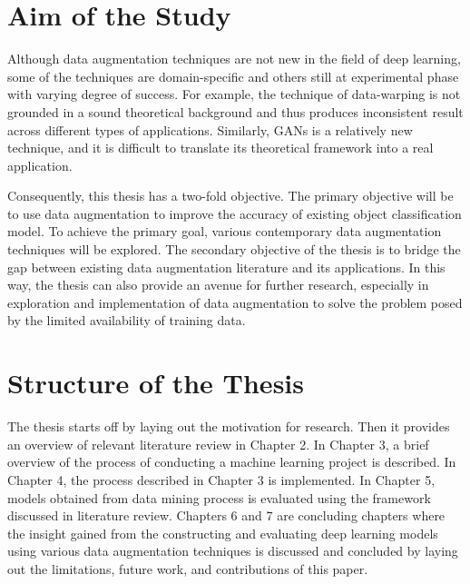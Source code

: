 \section{Aim of the Study}

Although data augmentation techniques are not new in the field of deep learning, some of the techniques are domain-specific and others still at experimental phase with varying degree of success. For example, the technique of data-warping is not grounded in a sound theoretical background and thus produces inconsistent result across different types of applications. Similarly, GANs is a relatively new technique, and it is difficult to translate its theoretical framework into a real application.

Consequently, this thesis has a two-fold objective. The primary objective will be to use data augmentation to improve the accuracy of existing object classification model. To achieve the primary goal, various contemporary data augmentation techniques will be explored. The secondary objective of the thesis is to bridge the gap between existing data augmentation literature and its applications. In this way, the thesis can also provide an avenue for further research, especially in exploration and implementation of data augmentation to solve the problem posed by the limited availability of training data. 

\section{Structure of the Thesis}
\label{section:structure} 
The thesis starts off by laying out the motivation for research. Then it provides an overview of relevant literature review in Chapter 2. In Chapter 3, a brief overview of the process of conducting a machine learning project is described. In Chapter 4, the process described in Chapter 3 is implemented. In Chapter 5, models obtained from data mining process is evaluated using the framework discussed in literature review. Chapters 6 and 7 are concluding chapters where the insight gained from the constructing and evaluating deep learning models using various data augmentation techniques is discussed and concluded by laying out the limitations, future work, and contributions of this paper.       

